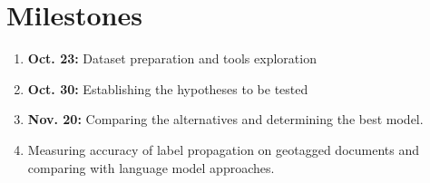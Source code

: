 \documentclass[11pt]{article}
\begin{document}
\section{Milestones}
\begin{enumerate}
    \item \textbf{Oct. 23:} Dataset preparation and tools exploration
    \item \textbf{Oct. 30:} Establishing the hypotheses to be tested
    \item \textbf{Nov. 20:} Comparing the alternatives and determining the best model.
    \item Measuring accuracy of label propagation on geotagged documents and comparing with language model approaches.
\end{enumerate}

%



\end{document}
